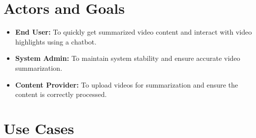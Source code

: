 \documentclass{bscs}
\begin{document}
\section{Actors and Goals}

\begin{itemize}
    \item \textbf{End User:} To quickly get summarized video content and interact with video highlights using a chatbot.
    \item \textbf{System Admin:} To maintain system stability and ensure accurate video summarization. 
    \item \textbf{Content Provider:} To upload videos for summarization and ensure the content is correctly processed.    
\end{itemize}
\newpage

\section{Use Cases}
\end{document}
